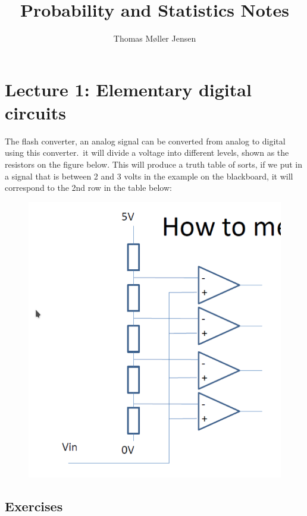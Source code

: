 \documentclass{article}
\title{Probability and Statistics Notes}
\author{Thomas Møller Jensen}
\begin{document}
\maketitle
\section*{Lecture 1: Elementary digital circuits}
The flash converter, an analog signal can be converted from analog to digital using this converter.\ it will divide a voltage into different levels, shown as the resistors on the figure below.
This will produce a truth table of sorts, if we put in a signal that is between 2 and 3 volts in the example on the blackboard, it will correspond to the 2nd row in the table below:
\begin{figure}[H]
	\centering
	\includegraphics[width=\textwidth]{image.png}
\end{figure}

\subsection*{Exercises}
\end{document}
